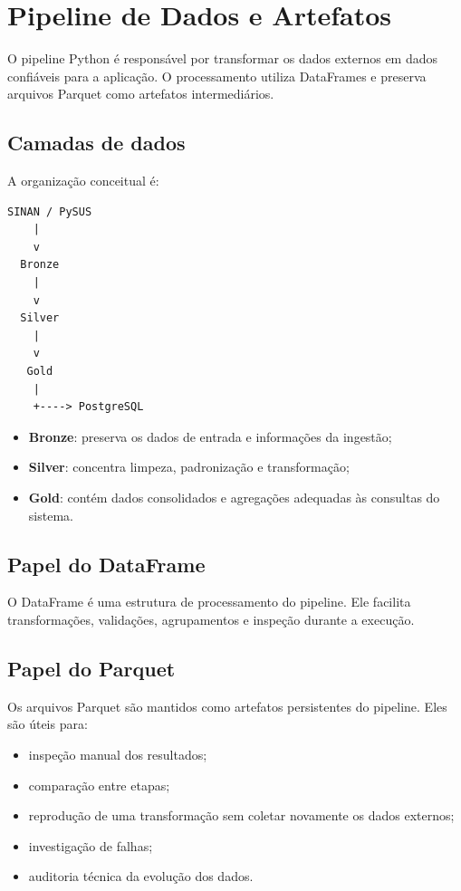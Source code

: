 \section{Pipeline de Dados e Artefatos}

O pipeline Python é responsável por transformar os dados externos em dados confiáveis para a aplicação. O processamento utiliza DataFrames e preserva arquivos Parquet como artefatos intermediários.

\subsection{Camadas de dados}

A organização conceitual é:

\begin{lstlisting}
SINAN / PySUS
    |
    v
  Bronze
    |
    v
  Silver
    |
    v
   Gold
    |
    +----> PostgreSQL
\end{lstlisting}

\begin{itemize}
    \item \textbf{Bronze}: preserva os dados de entrada e informações da ingestão;
    \item \textbf{Silver}: concentra limpeza, padronização e transformação;
    \item \textbf{Gold}: contém dados consolidados e agregações adequadas às consultas do sistema.
\end{itemize}

\subsection{Papel do DataFrame}

O DataFrame é uma estrutura de processamento do pipeline. Ele facilita transformações, validações, agrupamentos e inspeção durante a execução.

\subsection{Papel do Parquet}

Os arquivos Parquet são mantidos como artefatos persistentes do pipeline. Eles são úteis para:

\begin{itemize}
    \item inspeção manual dos resultados;
    \item comparação entre etapas;
    \item reprodução de uma transformação sem coletar novamente os dados externos;
    \item investigação de falhas;
    \item auditoria técnica da evolução dos dados.
\end{itemize}

